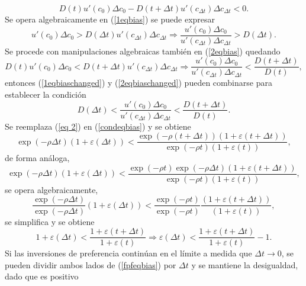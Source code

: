 \begin{equation}\label{2eqbias}
    D(t) u'(c_0) \Delta c_0 - D (t+\Delta t) u'(c_{\Delta t}) \Delta c_{\Delta t}<0.
\end{equation}
%
Se opera algebraicamente en (\ref{1eqbias}) se puede expresar 
\begin{equation}
\label{1eqbiaschanged}
    u'(c_0) \Delta c_0 > D (\Delta t) u'(c_{\Delta t}) \Delta c_{\Delta t} \Rightarrow
\dfrac{u'(c_0) \Delta c_0}{u'(c_{\Delta t}) \Delta c_{\Delta t}} > D (\Delta t).
\end{equation}  
%
Se procede con manipulaciones algebraicas también en (\ref{2eqbias}) quedando
 \begin{equation}
\label{2eqbiaschanged}
 D(t) u'(c_0) \Delta c_0 < D (t+\Delta t) u'(c_{\Delta t}) \Delta c_{\Delta t} \Rightarrow
 \dfrac{u'(c_0) \Delta c_0 }{u'(c_{\Delta t}) \Delta c_{\Delta t}} < \frac{D (t+\Delta t)}{D(t)}, \end{equation}
%
entonces (\ref{1eqbiaschanged}) y (\ref{2eqbiaschanged}) pueden combinarse para establecer la condición
\begin{equation}
\label{condeqbias}
    D(\Delta t) < \dfrac{u'(c_0)\Delta c_0}{u'(c_{\Delta t})\Delta c_{\Delta t}}< \dfrac{D(t+\Delta t)}{D(t)}.
\end{equation}
%
Se reemplaza (\ref{eq 2}) en (\ref{condeqbias}) y se obtiene 
$$\exp(-\rho \Delta t)(1+ \varepsilon(\Delta t))< \dfrac{\exp(-\rho (t + \Delta t))(1+ \varepsilon(t + \Delta t))}{\exp(-\rho  t)(1+ \varepsilon(t))},$$
%
de forma análoga,
$$\exp(-\rho \Delta t)(1+ \varepsilon(\Delta t))< \dfrac{\exp(-\rho t)\exp(-\rho \Delta t)(1+ \varepsilon(t + \Delta t))}{\exp(-\rho  t)(1+ \varepsilon(t))},$$
%
se opera algebraicamente,
$$\dfrac{\exp(-\rho \Delta t)}{\exp(-\rho \Delta t)}(1+ \varepsilon(\Delta t))< \dfrac{\exp(-\rho t)}{\exp(-\rho t)}\dfrac{(1+ \varepsilon(t + \Delta t))}{(1+ \varepsilon(t))},$$
%
se simplifica y se obtiene
\begin{equation}
\label{fpfeqbias}
1+ \varepsilon(\Delta t)< \dfrac{1+ \varepsilon(t + \Delta t)}{1+ \varepsilon(t)} \Rightarrow
\varepsilon(\Delta t)<\frac{1+ \varepsilon(t+\Delta t)}{1+\varepsilon(t)}-1.
\end{equation}
%
Si las inversiones de preferencia continúan en el límite a medida que $\Delta t \rightarrow 0$, se pueden dividir ambos lados de (\ref{fpfeqbias}) por $\Delta t$ y se mantiene la desigualdad, dado que es positivo

